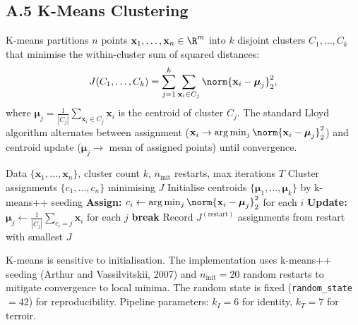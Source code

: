 \documentclass[11pt]{article}
\begin{document}
\subsection*{A.5 K-Means Clustering}
K-means partitions $n$ points $\mathbf{x}_1, \ldots, \mathbf{x}_n \in \R^m$ into $k$ disjoint clusters $C_1, \ldots, C_k$ that minimise the within-cluster sum of squared distances:
\[
J(C_1, \ldots, C_k) = \sum_{j=1}^{k} \sum_{\mathbf{x}_i \in C_j} \norm{\mathbf{x}_i - \boldsymbol\mu_j}_2^2,
\]
where $\boldsymbol\mu_j = \frac{1}{|C_j|} \sum_{\mathbf{x}_i \in C_j} \mathbf{x}_i$ is the centroid of cluster $C_j$. The standard Lloyd algorithm alternates between assignment ($\mathbf{x}_i \to \arg\min_j \norm{\mathbf{x}_i - \boldsymbol\mu_j}_2^2$) and centroid update ($\boldsymbol\mu_j \to$ mean of assigned points) until convergence.

\begin{algorithm}[H]
\caption{Lloyd's K-means algorithm}
\begin{algorithmic}[1]
\Require Data $\{\mathbf{x}_1, \ldots, \mathbf{x}_n\}$, cluster count $k$, $n_\text{init}$ restarts, max iterations $T$
\Ensure Cluster assignments $\{c_1, \ldots, c_n\}$ minimising $J$
  \State Initialise centroids $\{\boldsymbol\mu_1, \ldots, \boldsymbol\mu_k\}$ by k-means++ seeding
    \State \textbf{Assign:} $c_i \gets \arg\min_j \norm{\mathbf{x}_i - \boldsymbol\mu_j}_2^2$ for each $i$
    \State \textbf{Update:} $\boldsymbol\mu_j \gets \frac{1}{|C_j|} \sum_{c_i = j} \mathbf{x}_i$ for each $j$
     \textbf{break} \EndIf
  \EndFor
  \State Record $J^{(\text{restart})}$
\EndFor
\State \Return assignments from restart with smallest $J$
\end{algorithmic}
\end{algorithm}

K-means is sensitive to initialisation. The implementation uses k-means++ seeding (Arthur and Vassilvitskii, 2007) and $n_\text{init} = 20$ random restarts to mitigate convergence to local minima. The random state is fixed (\texttt{random\_state} $= 42$) for reproducibility. Pipeline parameters: $k_I = 6$ for identity, $k_T = 7$ for terroir.
\end{document}
